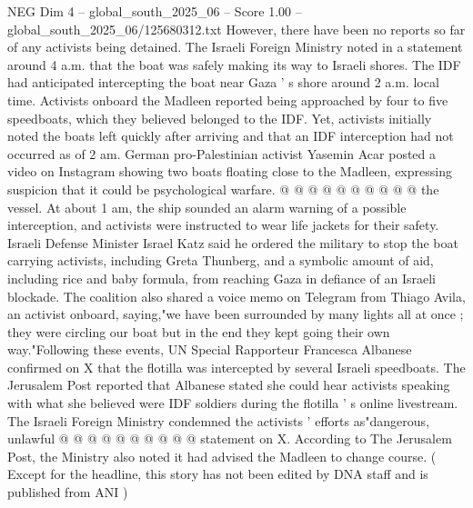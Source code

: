 \begin{textsample}{NEG Dim 4 – global\_south\_2025\_06 – Score 1.00 – global\_south\_2025\_06/125680312.txt}
However, there have been no reports so far of any activists being detained.
The Israeli Foreign Ministry noted in a statement around 4 a.m. that the boat was safely making its way to Israeli shores.
The IDF had anticipated intercepting the boat near Gaza ' s shore around 2 a.m. local time.
Activists onboard the Madleen reported being approached by four to five speedboats, which they believed belonged to the IDF.
Yet, activists initially noted the boats left quickly after arriving and that an IDF interception had not occurred as of 2 am.
German pro-Palestinian activist Yasemin Acar posted a video on Instagram showing two boats floating close to the Madleen, expressing suspicion that it could be psychological warfare. @ @ @ @ @ @ @ @ @ @ the vessel.
At about 1 am, the ship sounded an alarm warning of a possible interception, and activists were instructed to wear life jackets for their safety.
Israeli Defense Minister Israel Katz said he ordered the military to stop the boat carrying activists, including Greta Thunberg, and a symbolic amount of aid, including rice and baby formula, from reaching Gaza in defiance of an Israeli blockade.
The coalition also shared a voice memo on Telegram from Thiago Avila, an activist onboard, saying,"we have been surrounded by many lights all at once ; they were circling our boat but in the end they kept going their own way."Following these events, UN Special Rapporteur Francesca Albanese confirmed on X that the flotilla was intercepted by several Israeli speedboats.
The Jerusalem Post reported that Albanese stated she could hear activists speaking with what she believed were IDF soldiers during the flotilla ' s online livestream.
The Israeli Foreign Ministry condemned the activists ' efforts as"dangerous, unlawful @ @ @ @ @ @ @ @ @ @ statement on X.
According to The Jerusalem Post, the Ministry also noted it had advised the Madleen to change course. ( Except for the headline, this story has not been edited by DNA staff and is published from ANI )

\end{textsample}
